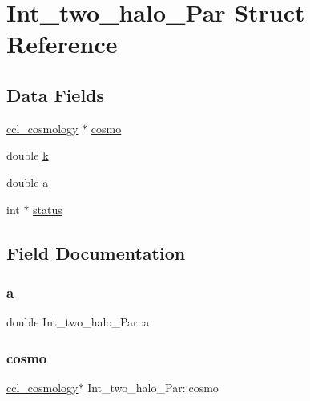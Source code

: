 \hypertarget{struct_int__two__halo___par}{}\section{Int\+\_\+two\+\_\+halo\+\_\+\+Par Struct Reference}
\label{struct_int__two__halo___par}
\subsection*{Data Fields}
\begin{DoxyCompactItemize}
\item 
\mbox{\hyperlink{structccl__cosmology}{ccl\+\_\+cosmology}} $\ast$ \mbox{\hyperlink{struct_int__two__halo___par_a04cdcbef5ce7193c0421e9557dd9ca53}{cosmo}}
\item 
double \mbox{\hyperlink{struct_int__two__halo___par_a9fba74022c445bfe7681c06257adae56}{k}}
\item 
double \mbox{\hyperlink{struct_int__two__halo___par_a05cb880a3c368cc0d3e67c594d5c5692}{a}}
\item 
int $\ast$ \mbox{\hyperlink{struct_int__two__halo___par_a4cf1dbf22fee89b7595dd9adda2c44a8}{status}}
\end{DoxyCompactItemize}


\subsection{Field Documentation}
\mbox{\label{struct_int__two__halo___par_a05cb880a3c368cc0d3e67c594d5c5692}} 
\subsubsection{\texorpdfstring{a}{a}}
{\footnotesize\ttfamily double Int\+\_\+two\+\_\+halo\+\_\+\+Par\+::a}

\mbox{\label{struct_int__two__halo___par_a04cdcbef5ce7193c0421e9557dd9ca53}} 
\subsubsection{\texorpdfstring{cosmo}{cosmo}}
{\footnotesize\ttfamily \mbox{\hyperlink{structccl__cosmology}{ccl\+\_\+cosmology}}$\ast$ Int\+\_\+two\+\_\+halo\+\_\+\+Par\+::cosmo}

